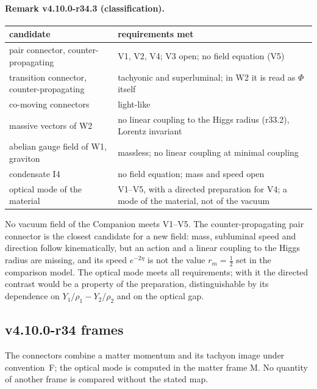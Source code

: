 \paragraph{Remark v4.10.0-r34.3 (classification).}
\begin{center}
\small
\begin{tabular}{@{}>{\raggedright\arraybackslash}p{}>{\raggedright\arraybackslash}p{}@{}}
\toprule
candidate & requirements met\\
\midrule
pair connector, counter-propagating & V1, V2, V4; V3 open; no field equation (V5)\\
transition connector, counter-propagating & tachyonic and superluminal; in W2 it is read as \(\Phi\) itself\\
co-moving connectors & light-like\\
massive vectors of W2 & no linear coupling to the Higgs radius (r33.2), Lorentz invariant\\
abelian gauge field of W1, graviton & massless; no linear coupling at minimal coupling\\
condensate I4 & no field equation; mass and speed open\\
optical mode of the material & V1--V5, with a directed preparation for V4; a mode of the material, not of the vacuum\\
\bottomrule
\end{tabular}
\end{center}
No vacuum field of the Companion meets V1--V5.  The counter-propagating pair connector is the closest candidate for a new field: mass,
subluminal speed and direction follow kinematically, but an action and a linear coupling to the Higgs radius are missing, and its speed
\(e^{-2\eta}\) is not the value \(r_m=\tfrac12\) set in the comparison model.  The optical mode meets all requirements; with it the directed
contrast would be a property of the preparation, distinguishable by its dependence on \(Y_1/\rho_1-Y_2/\rho_2\) and on the optical gap.

\subsection*{v4.10.0-r34 frames}
\label{subsec:v4100-r34-frames}

The connectors combine a matter momentum and its tachyon image under convention~F; the optical mode is computed in the matter frame M.  No
quantity of another frame is compared without the stated map.

